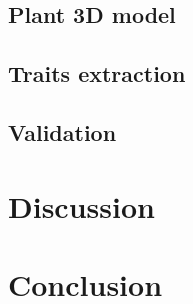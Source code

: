 

\subsection{Plant 3D model}



\subsection{Traits extraction}




\subsection{Validation}



\section{Discussion}



\section{Conclusion}